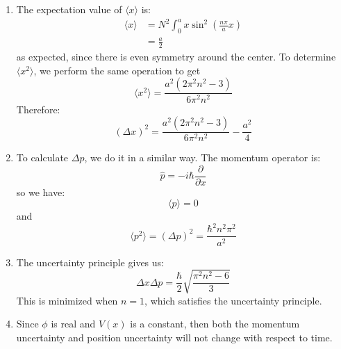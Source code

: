 \begin{sol}
\begin{enumerate}[label=\textbf{(\alph*)}]
\item The expectation value of $\langle x \rangle$ is:
\begin{align*}
    \langle x \rangle &= N^2\int_0^a x\sin^2\left(\frac{n\pi}{a}x\right) \\
    &= \frac{a}{2}
\end{align*}
as expected, since there is even symmetry around the center. To determine $\langle x^2 \rangle$, we perform the same operation to get
$$\langle x^2 \rangle = \frac{a^{2}\left(2\pi^{2}n^{2}-3\right)}{6\pi^{2}n^{2}}$$
Therefore:
$$(\Delta x)^2=\frac{a^{2}\left(2\pi^{2}n^{2}-3\right)}{6\pi^{2}n^{2}}-\frac{a^2}{4}$$
\item To calculate $\Delta p$, we do it in a similar way. The momentum operator is:
$$\hat{p}=-i\hbar\frac{\partial}{\partial x}$$
so we have:
$$\langle p \rangle =0$$
and
$$\langle p^2 \rangle = (\Delta p)^2=\frac{\hbar^2 n^2 \pi^2}{a^2}$$
\item The uncertainty principle gives us:
$$\Delta x\Delta p = \frac{\hbar}{2}\sqrt{\frac{\pi^2n^2-6}{3}}$$
This is minimized when $n=1$, which satisfies the uncertainty principle.
\item Since $\phi$ is real and $V(x)$ is a constant, then both the momentum uncertainty and position uncertainty will not change with respect to time.
\end{enumerate}
\end{sol}